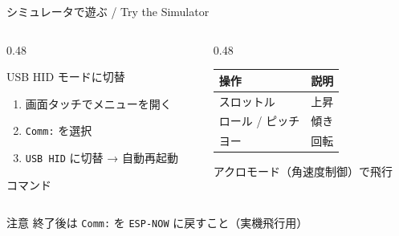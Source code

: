 \documentclass[aspectratio=169, 14pt]{beamer}
\begin{document}
\begin{frame}{シミュレータで遊ぶ / Try the Simulator}
  \begin{columns}[T]
    \begin{column}{0.48\textwidth}
      \begin{block}{USB HID モードに切替}\footnotesize
        \begin{enumerate}\setlength{\itemsep}{0pt}
          \item 画面タッチでメニューを開く
          \item \texttt{Comm:} を選択
          \item \texttt{USB HID} に切替 → 自動再起動
        \end{enumerate}
      \end{block}
      \vspace{0.2em}
      \begin{block}{コマンド}\footnotesize
        \\
      \end{block}
    \end{column}
    \begin{column}{0.48\textwidth}
      \footnotesize
      \begin{table}
        \centering\footnotesize
        \begin{tabular}{ll}
          \hline
          \textbf{操作} & \textbf{説明} \\
          \hline
          スロットル       & 上昇 \\
          ロール / ピッチ  & 傾き \\
          ヨー             & 回転 \\
          \hline
        \end{tabular}
      \end{table}
      \vspace{-0.5em}
      アクロモード（角速度制御）で飛行
    \end{column}
  \end{columns}

  \begin{alertblock}{注意}\footnotesize
    終了後は \texttt{Comm:} を \texttt{ESP-NOW} に戻すこと（実機飛行用）
  \end{alertblock}
\end{frame}
\end{document}
